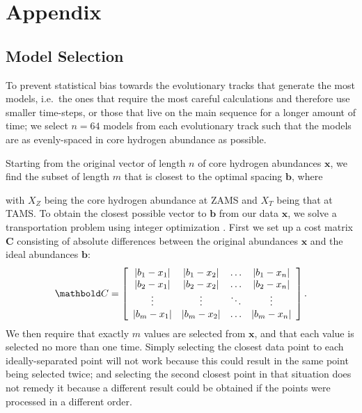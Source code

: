 \section{Appendix}
\subsection{Model Selection}
\label{sec:selection}
To prevent statistical bias towards the evolutionary tracks that generate the most models, i.e.\ the ones that require the most careful calculations and therefore use smaller time-steps, or those that live on the main sequence for a longer amount of time; we select ${n=64}$ models from each evolutionary track such that the models are as evenly-spaced in core hydrogen abundance as possible. 

Starting from the original vector of length $n$ of core hydrogen abundances $\mathbf x$, we find the subset of length $m$ that is closest to the optimal spacing $\mathbf b$, where

with $X_Z$ being the core hydrogen abundance at ZAMS and $X_T$ being that at TAMS. To obtain the closest possible vector to $\mathbf b$ from our data $\mathbf x$, we solve a transportation problem using integer optimization \citep{23145595}. First we set up a cost matrix $\boldsymbol{C}$ consisting of absolute differences between the original abundances $\mathbf x$ and the ideal abundances $\mathbf b$:
\begin{equation} 
  \boldsymbol{C} = \left[
  \begin{array}{cccc}
    \abs{b_1-x_1} & \abs{b_1-x_2} & \dots & \abs{b_1-x_n} \\
    \abs{b_2-x_1} & \abs{b_2-x_2} & \dots & \abs{b_2-x_n} \\
    \vdots & \vdots & \ddots & \vdots \\
    \abs{b_m-x_1} & \abs{b_m-x_2} & \dots & \abs{b_m-x_n}
  \end{array} \right].
\end{equation}
We then require that exactly $m$ values are selected from $\mathbf x$, and that each value is selected no more than one time. Simply selecting the closest data point to each ideally-separated point will not work because this could result in the same point being selected twice; and selecting the second closest point in that situation does not remedy it because a different result could be obtained if the points were processed in a different order. 

